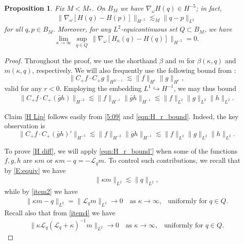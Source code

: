 \documentclass{amsart}
\numberwithin{equation}{section}
\newtheorem{proposition}[theorem]{Proposition}
\theoremstyle{definition}
\newcommand{\om}{\omega}
\newcommand{\ka}{\kappa}
\newcommand{\Q}{\mathcal{Q}}
\newcommand{\Lc}{\mathcal{L}}
\newcommand{\na}{\nabla}
\begin{document}
\begin{proposition}\label{prop:diff_estimate}
Fix $M<M_\ast$. On $B_M$ we have $\na_\om H(q)\in H^{-5}$; in fact,
\begin{align}\label{H Lip}
\bigl\|\na_\om [H(q)-H(p)]\bigr\|_{H^{-5}}\lesssim_M \|q-p\|_{L^2}
\end{align} 
for all $q,p\in B_M$.  Moreover, for any $L^2$-equicontinuous set $Q\subset B_M$, we have
\begin{align}\label{H diff}
\lim_{\ka\to\infty}\,\sup_{q\in Q}\,\bigl\|\na_\om[H_\ka(q)-H(q)]\bigr\|_{H^{-5}}=0.
\end{align}
\end{proposition}

\begin{proof}
Throughout the proof, we use the shorthand $\beta$ and $m$ for $\beta(\ka,q)$ and $m(\ka,q)$, respectively.  We will also frequently use the following bound from \cite[Lemma~2.2]{killip2024sharp}:
\begin{equation}\label{eqn:H_r_bound}
\|C_+f\cdot C_+g\|_{H^{2r-1}}\lesssim\|f\|_{H^r}\|g\|_{H^r},
\end{equation}
valid for any $r<0$. Employing the embedding $L^1\hookrightarrow H^{-1}$, we may thus bound
\begin{align}\label{eqn:H_r_bound'}
\|C_+f\cdot C_+(\bar gh)\|_{H^{-3}}\lesssim \|f\|_{H^{-1}} \|\bar gh\|_{H^{-1}} \lesssim \|f\|_{L^2} \|g\|_{L^2} \|h\|_{L^2}.
\end{align}

Claim \eqref{H Lip} follows easily from \eqref{5:09} and \eqref{eqn:H_r_bound}.  Indeed, the key observation is
$$
\|C_+f\cdot C_+(\bar g h)'\|_{H^{-5}}\lesssim \|f\|_{H^{-2}} \|\bar gh\|_{H^{-1}}  \lesssim \|f\|_{L^2} \|g\|_{L^2} \|h\|_{L^2}.
$$

To prove \eqref{H diff}, we will apply \eqref{eqn:H_r_bound'} when some of the functions $f,g,h$ are $\ka m$ or $\ka m -q = - \Lc_q m$.  To control such contributions, we recall that by \eqref{E:equiv} we have
\begin{align}\label{1}
\|\ka m\|_{L^2} \lesssim \|q\|_{L^2}, 
\end{align}
while by \eqref{item2} we have
\begin{align}\label{2}
\|\ka m-q\|_{L^2} =\|\Lc_q m\|_{L^2} \to 0  \quad \text{as $\ka \to \infty$,}\quad\text{uniformly for $q\in Q$}.
\end{align}
Recall also that from \eqref{item4} we have
\begin{align}\label{3}
\|\ka\Lc_q (\Lc_q+\ka)^{-1}m\|_{L^2} \to 0  \quad \text{as $\ka \to \infty$,}\quad\text{uniformly for $q\in Q$}.
\end{align}


\end{proof}
\end{document}
